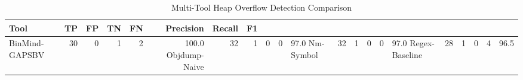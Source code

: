 \begin{table}[htbp]
\centering
\caption{Multi-Tool Heap Overflow Detection Comparison}
\label{tab:multi-tool}
\begin{tabular}{lrrrrrrr}
\toprule
Tool & TP & FP & TN & FN & Precision & Recall & F1 \\
\midrule
BinMind-GAPSBV & 30 & 0 & 1 & 2 & 100.0%
Objdump-Naive & 32 & 1 & 0 & 0 & 97.0%
Nm-Symbol & 32 & 1 & 0 & 0 & 97.0%
Regex-Baseline & 28 & 1 & 0 & 4 & 96.5%
\bottomrule
\end{tabular}
\end{table}
